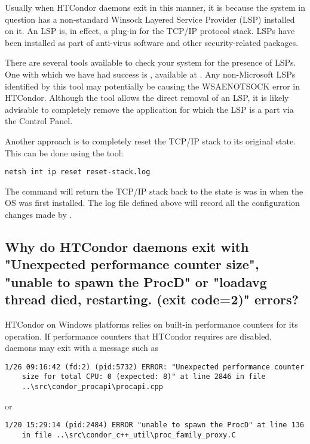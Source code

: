 Usually when HTCondor daemons exit in this manner, it is because the system in
question has a non-standard Winsock Layered Service Provider (LSP) installed
on it. An LSP is, in effect, a plug-in for the TCP/IP protocol stack.
LSPs have been 
installed as part of anti-virus software and other security-related
packages.

There are several tools available to check your system for the
presence of LSPs. One with which we have had success is ,
available at .
Any non-Microsoft LSPs identified by
this tool may potentially be causing the WSAENOTSOCK error in HTCondor.
Although the  tool allows the direct removal of an LSP,
it is likely advisable to completely remove the application for which
the LSP is a part via the Control Panel.

Another approach is to completely reset the TCP/IP stack to its
original state.  This can be done using the \verb@netsh@ tool:
\begin{verbatim}
netsh int ip reset reset-stack.log
\end{verbatim}
The command will return the TCP/IP stack back to the state is was
in when the OS was first installed.  The log file defined above will
record all the configuration changes made by \verb@netsh@.

\subsection*{Why do HTCondor daemons exit with "Unexpected performance counter size", "unable to spawn the ProcD" or "loadavg thread died, restarting. (exit code=2)" errors?}

HTCondor on Windows platforms relies on built-in performance counters
for its operation. 
If performance counters that HTCondor requires are disabled,
daemons may exit with a message such as

\footnotesize
\begin{verbatim}
1/26 09:16:42 (fd:2) (pid:5732) ERROR: "Unexpected performance counter
    size for total CPU: 0 (expected: 8)" at line 2846 in file
    ..\src\condor_procapi\procapi.cpp
\end{verbatim}
\normalsize

or

\footnotesize
\begin{verbatim}
1/20 15:29:14 (pid:2484) ERROR "unable to spawn the ProcD" at line 136
    in file ..\src\condor_c++_util\proc_family_proxy.C
\end{verbatim}
\normalsize

